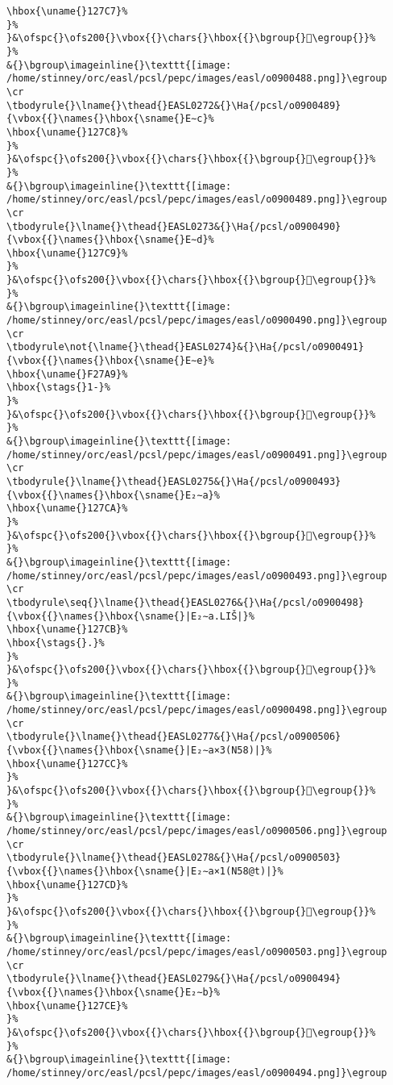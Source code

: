 \begin{verbatim}
\hbox{\uname{}127C7}%
}%
}&\ofspc{}\ofs200{}\vbox{{}\chars{}\hbox{{}\bgroup{}𒟇\egroup{}}%
}%
&{}\bgroup\imageinline{}\texttt{[image: /home/stinney/orc/easl/pcsl/pepc/images/easl/o0900488.png]}\egroup
\cr
\tbodyrule{}\lname{}\thead{}EASL0272&{}\Ha{/pcsl/o0900489}{\vbox{{}\names{}\hbox{\sname{}E∼c}%
\hbox{\uname{}127C8}%
}%
}&\ofspc{}\ofs200{}\vbox{{}\chars{}\hbox{{}\bgroup{}𒟈\egroup{}}%
}%
&{}\bgroup\imageinline{}\texttt{[image: /home/stinney/orc/easl/pcsl/pepc/images/easl/o0900489.png]}\egroup
\cr
\tbodyrule{}\lname{}\thead{}EASL0273&{}\Ha{/pcsl/o0900490}{\vbox{{}\names{}\hbox{\sname{}E∼d}%
\hbox{\uname{}127C9}%
}%
}&\ofspc{}\ofs200{}\vbox{{}\chars{}\hbox{{}\bgroup{}𒟉\egroup{}}%
}%
&{}\bgroup\imageinline{}\texttt{[image: /home/stinney/orc/easl/pcsl/pepc/images/easl/o0900490.png]}\egroup
\cr
\tbodyrule\not{\lname{}\thead{}EASL0274}&{}\Ha{/pcsl/o0900491}{\vbox{{}\names{}\hbox{\sname{}E∼e}%
\hbox{\uname{}F27A9}%
\hbox{\stags{}1-}%
}%
}&\ofspc{}\ofs200{}\vbox{{}\chars{}\hbox{{}\bgroup{}󲞩\egroup{}}%
}%
&{}\bgroup\imageinline{}\texttt{[image: /home/stinney/orc/easl/pcsl/pepc/images/easl/o0900491.png]}\egroup
\cr
\tbodyrule{}\lname{}\thead{}EASL0275&{}\Ha{/pcsl/o0900493}{\vbox{{}\names{}\hbox{\sname{}E₂∼a}%
\hbox{\uname{}127CA}%
}%
}&\ofspc{}\ofs200{}\vbox{{}\chars{}\hbox{{}\bgroup{}𒟊\egroup{}}%
}%
&{}\bgroup\imageinline{}\texttt{[image: /home/stinney/orc/easl/pcsl/pepc/images/easl/o0900493.png]}\egroup
\cr
\tbodyrule\seq{}\lname{}\thead{}EASL0276&{}\Ha{/pcsl/o0900498}{\vbox{{}\names{}\hbox{\sname{}|E₂∼a.LIŠ|}%
\hbox{\uname{}127CB}%
\hbox{\stags{}.}%
}%
}&\ofspc{}\ofs200{}\vbox{{}\chars{}\hbox{{}\bgroup{}𒟋\egroup{}}%
}%
&{}\bgroup\imageinline{}\texttt{[image: /home/stinney/orc/easl/pcsl/pepc/images/easl/o0900498.png]}\egroup
\cr
\tbodyrule{}\lname{}\thead{}EASL0277&{}\Ha{/pcsl/o0900506}{\vbox{{}\names{}\hbox{\sname{}|E₂∼a×3(N58)|}%
\hbox{\uname{}127CC}%
}%
}&\ofspc{}\ofs200{}\vbox{{}\chars{}\hbox{{}\bgroup{}𒟌\egroup{}}%
}%
&{}\bgroup\imageinline{}\texttt{[image: /home/stinney/orc/easl/pcsl/pepc/images/easl/o0900506.png]}\egroup
\cr
\tbodyrule{}\lname{}\thead{}EASL0278&{}\Ha{/pcsl/o0900503}{\vbox{{}\names{}\hbox{\sname{}|E₂∼a×1(N58@t)|}%
\hbox{\uname{}127CD}%
}%
}&\ofspc{}\ofs200{}\vbox{{}\chars{}\hbox{{}\bgroup{}𒟍\egroup{}}%
}%
&{}\bgroup\imageinline{}\texttt{[image: /home/stinney/orc/easl/pcsl/pepc/images/easl/o0900503.png]}\egroup
\cr
\tbodyrule{}\lname{}\thead{}EASL0279&{}\Ha{/pcsl/o0900494}{\vbox{{}\names{}\hbox{\sname{}E₂∼b}%
\hbox{\uname{}127CE}%
}%
}&\ofspc{}\ofs200{}\vbox{{}\chars{}\hbox{{}\bgroup{}𒟎\egroup{}}%
}%
&{}\bgroup\imageinline{}\texttt{[image: /home/stinney/orc/easl/pcsl/pepc/images/easl/o0900494.png]}\egroup

\end{verbatim}
